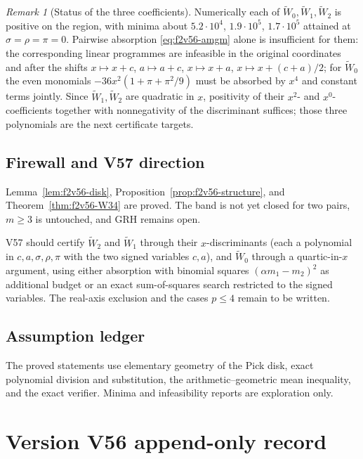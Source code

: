 \documentclass[11pt]{article}
\theoremstyle{definition}
\theoremstyle{remark}
\newtheorem{remark}[theorem]{Remark}
\begin{document}
\begin{remark}[Status of the three coefficients]
\label{rem:f2v56-status}
Numerically each of \(\widetilde W_0,\widetilde W_1,\widetilde W_2\) is
positive on the region, with minima about \(5.2\cdot10^4\),
\(1.9\cdot10^5\), \(1.7\cdot10^5\) attained at \(\sigma=\rho=\pi=0\).
Pairwise absorption \eqref{eq:f2v56-amgm} alone is insufficient for
them: the corresponding linear programmes are infeasible in the original
coordinates and after the shifts \(x\mapsto x+c\), \(a\mapsto a+c\),
\(x\mapsto x+a\), \(x\mapsto x+(c+a)/2\); for \(\widetilde W_0\) the
even monomials \(-36x^2(1+\pi+\pi^2/9)\) must be absorbed by \(x^4\)
and constant terms jointly.  Since \(\widetilde W_1,\widetilde W_2\) are
quadratic in \(x\), positivity of their \(x^2\)- and \(x^0\)-coefficients
together with nonnegativity of the discriminant suffices; those three
polynomials are the next certificate targets.
\end{remark}

\subsection*{Firewall and V57 direction}
\label{fire:f2v56}
Lemma~\ref{lem:f2v56-disk}, Proposition~\ref{prop:f2v56-structure}, and
Theorem~\ref{thm:f2v56-W34} are proved.  The band is not yet closed for
two pairs, \(m\ge3\) is untouched, and GRH remains open.

V57 should certify \(\widetilde W_2\) and \(\widetilde W_1\) through
their \(x\)-discriminants (each a polynomial in \(c,a,\sigma,\rho,\pi\)
with the two signed variables \(c,a\)), and \(\widetilde W_0\) through
a quartic-in-\(x\) argument, using either absorption with binomial
squares \((\alpha m_1-m_2)^2\) as additional budget or an exact
sum-of-squares search restricted to the signed variables.  The real-axis
exclusion and the cases \(p\le4\) remain to be written.

\subsection*{Assumption ledger}
\label{ass:f2v56}
The proved statements use elementary geometry of the Pick disk, exact
polynomial division and substitution, the arithmetic--geometric mean
inequality, and the exact verifier.  Minima and infeasibility reports
are exploration only.
\endgroup

\section*{Version V56 append-only record}
\end{document}
